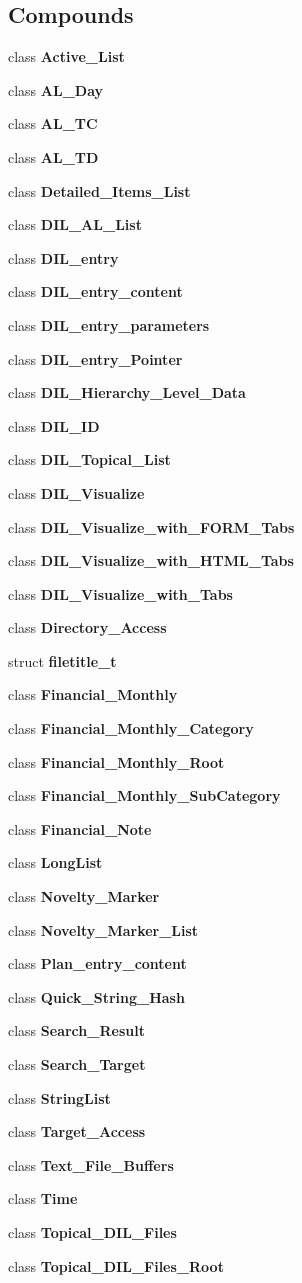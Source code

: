 \subsection*{Compounds}
\begin{CompactItemize}
\item 
class {\bf Active\_\-List}
\item 
class {\bf AL\_\-Day}
\item 
class {\bf AL\_\-TC}
\item 
class {\bf AL\_\-TD}
\item 
class {\bf Detailed\_\-Items\_\-List}
\item 
class {\bf DIL\_\-AL\_\-List}
\item 
class {\bf DIL\_\-entry}
\item 
class {\bf DIL\_\-entry\_\-content}
\item 
class {\bf DIL\_\-entry\_\-parameters}
\item 
class {\bf DIL\_\-entry\_\-Pointer}
\item 
class {\bf DIL\_\-Hierarchy\_\-Level\_\-Data}
\item 
class {\bf DIL\_\-ID}
\item 
class {\bf DIL\_\-Topical\_\-List}
\item 
class {\bf DIL\_\-Visualize}
\item 
class {\bf DIL\_\-Visualize\_\-with\_\-FORM\_\-Tabs}
\item 
class {\bf DIL\_\-Visualize\_\-with\_\-HTML\_\-Tabs}
\item 
class {\bf DIL\_\-Visualize\_\-with\_\-Tabs}
\item 
class {\bf Directory\_\-Access}
\item 
struct {\bf filetitle\_\-t}
\item 
class {\bf Financial\_\-Monthly}
\item 
class {\bf Financial\_\-Monthly\_\-Category}
\item 
class {\bf Financial\_\-Monthly\_\-Root}
\item 
class {\bf Financial\_\-Monthly\_\-Sub\-Category}
\item 
class {\bf Financial\_\-Note}
\item 
class {\bf Long\-List}
\item 
class {\bf Novelty\_\-Marker}
\item 
class {\bf Novelty\_\-Marker\_\-List}
\item 
class {\bf Plan\_\-entry\_\-content}
\item 
class {\bf Quick\_\-String\_\-Hash}
\item 
class {\bf Search\_\-Result}
\item 
class {\bf Search\_\-Target}
\item 
class {\bf String\-List}
\item 
class {\bf Target\_\-Access}
\item 
class {\bf Text\_\-File\_\-Buffers}
\item 
class {\bf Time}
\item 
class {\bf Topical\_\-DIL\_\-Files}
\item 
class {\bf Topical\_\-DIL\_\-Files\_\-Root}
\end{CompactItemize}
